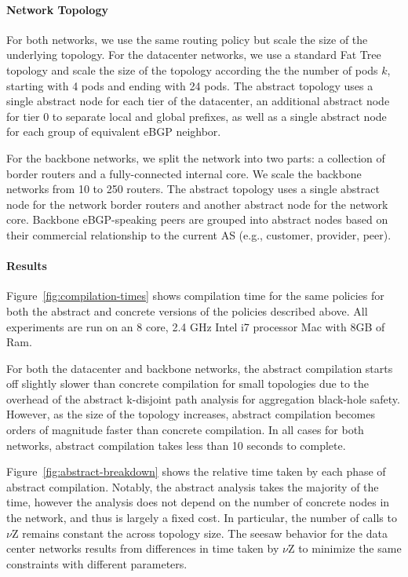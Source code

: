 \documentclass[numbers, 10pt, preprint]{sigplanconf}
\newcommand{\para}[1]{\paragraph*{\textbf{#1}}}
\begin{document}
\para{Network Topology}

For both networks, we use the same routing policy but scale the size of the underlying topology. For the datacenter networks, we use a standard Fat Tree topology and scale the size of the topology according the the number of pods $k$, starting with 4 pods and ending with 24 pods. The abstract topology uses a single abstract node for each tier of the datacenter, an additional abstract node for tier 0 to separate local and global prefixes, as well as a single abstract node for each group of equivalent eBGP neighbor.

For the backbone networks, we split the network into two parts: a collection of border routers and a fully-connected internal core. We scale the backbone networks from 10 to 250 routers. The abstract topology uses a single abstract node for the network border routers and another abstract node for the network core. Backbone eBGP-speaking peers are grouped into abstract nodes based on their commercial relationship to the current AS (e.g., customer, provider, peer).

\para{Results}

Figure~\ref{fig:compilation-times} shows compilation time for the same policies for both the abstract and concrete versions of the policies described above. All experiments are run on an 8 core, 2.4 GHz Intel i7 processor Mac with 8GB of Ram.

For both the datacenter and backbone networks, the abstract compilation starts off slightly slower than concrete compilation for small topologies due to the overhead of the abstract k-disjoint path analysis for aggregation black-hole safety. However, as the size of the topology increases, abstract compilation becomes orders of magnitude faster than concrete compilation. In all cases for both networks, abstract compilation takes less than 10 seconds to complete.

Figure~\ref{fig:abstract-breakdown} shows the relative time taken by each phase of abstract compilation. Notably, the abstract analysis takes the majority of the time, however the analysis does not depend on the number of concrete nodes in the network, and thus is largely a fixed cost. In particular, the number of calls to $\nu$Z remains constant the across topology size. The seesaw behavior for the data center networks results from differences in time taken by $\nu$Z to minimize the same constraints with different parameters.




%
%
%
%
\end{document}
